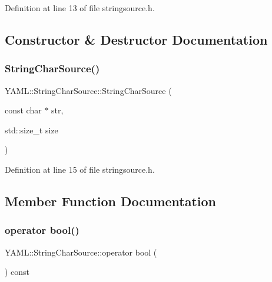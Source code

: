 Definition at line 13 of file stringsource.\+h.



\subsection{Constructor \& Destructor Documentation}
\mbox{\label{class_y_a_m_l_1_1_string_char_source_a6af978ba0ac95df336bcd017b2be10a2}} 
\subsubsection{\texorpdfstring{StringCharSource()}{StringCharSource()}}
{\footnotesize\ttfamily Y\+A\+M\+L\+::\+String\+Char\+Source\+::\+String\+Char\+Source (\begin{DoxyParamCaption}\item[{const char $\ast$}]{str,  }\item[{std\+::size\+\_\+t}]{size }\end{DoxyParamCaption})\hspace{0.3cm}{\ttfamily [inline]}}



Definition at line 15 of file stringsource.\+h.



\subsection{Member Function Documentation}
\mbox{\label{class_y_a_m_l_1_1_string_char_source_af34e46ac69934f0848916f145c7e097d}} 
\subsubsection{\texorpdfstring{operator bool()}{operator bool()}}
{\footnotesize\ttfamily Y\+A\+M\+L\+::\+String\+Char\+Source\+::operator bool (\begin{DoxyParamCaption}{ }\end{DoxyParamCaption}) const\hspace{0.3cm}{\ttfamily [inline]}}



